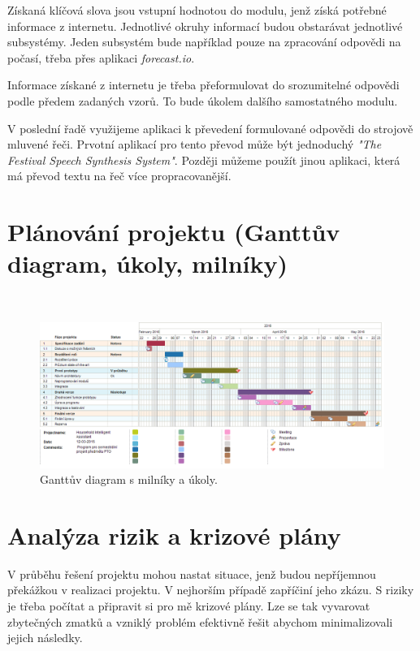 \documentclass[12pt,a4paper]{article}
\begin{document}
Získaná klíčová slova jsou vstupní hodnotou do modulu, jenž získá potřebné informace z internetu. Jednotlivé okruhy informací budou obstarávat jednotlivé subsystémy. Jeden subsystém bude například pouze na zpracování odpovědi na počasí, třeba přes aplikaci \textit{forecast.io}.

Informace získané z internetu je třeba přeformulovat do srozumitelné odpovědi podle předem zadaných vzorů. To bude úkolem dalšího samostatného modulu.

V poslední řadě využijeme aplikaci k převedení formulované odpovědi do strojově mluvené řeči. Prvotní aplikací pro tento převod může být jednoduchý \textit{"The Festival Speech Synthesis System"}. Později můžeme použít jinou aplikaci, která má převod textu na řeč více propracovanější.


\section*{Plánování projektu (Ganttův diagram, úkoly, milníky)}
\begin{landscape}
~\vfill
\begin{figure}[ht]
	\begin{center}
	\includegraphics[height = 0.6\textheight ]{PTO-Gantt.png}
	\caption{Ganttův diagram s milníky a úkoly.}
	\label{fig:diagram gantt}
	\end{center}
\end{figure}
\vfill
\end{landscape}

\section*{Analýza rizik a krizové plány}
V průběhu řešení projektu mohou nastat situace, jenž budou nepříjemnou překážkou v realizaci projektu. V nejhorším případě zapříčiní jeho zkázu. S riziky je třeba počítat a připravit si pro mě krizové plány. Lze se tak vyvarovat zbytečných zmatků a vzniklý problém efektivně řešit abychom minimalizovali jejich následky. \\
\end{document}
